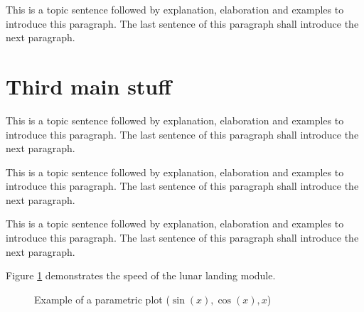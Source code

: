 This is a topic sentence followed by explanation, elaboration and examples to introduce this paragraph. The last sentence of this paragraph shall introduce the next paragraph. \lipsum[1]

\section{Third main stuff}
\label{sec:ch_3_thirdmain}

This is a topic sentence followed by explanation, elaboration and examples to introduce this paragraph. The last sentence of this paragraph shall introduce the next paragraph. \lipsum[1]

This is a topic sentence followed by explanation, elaboration and examples to introduce this paragraph. The last sentence of this paragraph shall introduce the next paragraph. \lipsum[1]

This is a topic sentence followed by explanation, elaboration and examples to introduce this paragraph. The last sentence of this paragraph shall introduce the next paragraph. \lipsum[1]


Figure \ref{fig:curve} demonstrates the speed of the lunar landing module.

\begin{figure}[h]
\caption{Example of a parametric plot ($\sin (x), \cos(x), x$)}
\label{fig:curve}
\centering
\end{figure}




